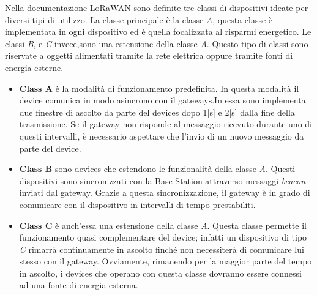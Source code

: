 Nella documentazione LoRaWAN sono definite tre classi di dispositivi ideate per 
diversi tipi di utilizzo. La classe principale è la classe \emph{A}, questa
classe è implementata in ogni dispositivo ed è quella focalizzata al risparmi
energetico. Le classi \emph{B}, e
\emph{C} invece,sono una estensione della classe \emph{A}. Questo tipo di classi sono
riservate a oggetti  alimentati tramite la rete elettrica oppure tramite 
fonti di energia esterne.  
\begin{itemize}
        \item   \textbf{Class A} è la modalità di funzionamento predefinita. 
                In questa modalità il device comunica in modo asincrono con il
                gateways.In essa sono implementa due finestre di ascolto da parte del devices
                dopo 1[s] e 2[s] dalla fine della trasmissione. Se il gateway non risponde al
                messaggio ricevuto durante uno di questi intervalli, è necessario aspettare che
                l'invio di un nuovo messaggio da parte del device.

        \item   \textbf{Class B} sono devices che estendono le funzionalità della classe
                \emph{A}. Questi dispositivi sono sincronizzati con la Base Station attraverso
                messaggi \emph{beacon} inviati dal gateway. Grazie a questa
                sincronizzazione, il gateway è in grado di comunicare con il
                dispositivo in intervalli di tempo prestabiliti.

        \item   \textbf{Class C} è anch'essa una estensione della classe \emph{A}. 
                Questa classe permette il funzionamento quasi complementare del device; infatti
                un  dispositivo di tipo \emph{C} rimarrà continuamente in ascolto finché non
                necessiterà di comunicare lui stesso con il gateway. Ovviamente, rimanendo per la
                maggior parte del tempo in ascolto, i devices che operano con questa classe
                dovranno essere connessi ad una fonte di energia esterna. 
\end{itemize}


